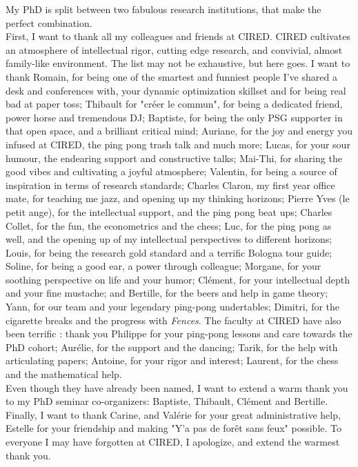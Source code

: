 My PhD is split between two fabulous research institutions, that make the perfect combination.
\\
First, I want to thank all my colleagues and friends at CIRED. CIRED cultivates an atmosphere of intellectual rigor, cutting edge research, and convivial, almost family-like environment. The list may not be exhaustive, but here goes. 
%
I want to thank Romain, for being one of the smartest and funniest people I've shared a desk and conferences with, your dynamic optimization skillset and for being real bad at paper toss; Thibault for "créer le commun", for being a dedicated friend, power horse and tremendous DJ; Baptiste, for being the only PSG supporter in that open space, and a brilliant critical mind;  Auriane, for the joy and energy you infused at CIRED, the ping pong trash talk and much more; Lucas, for your sour humour, the endearing support and constructive talks; Mai-Thi, for sharing the good vibes and cultivating a joyful atmosphere; Valentin, for being a source of inspiration in terms of research standards; Charles Claron, my first year office mate, for teaching me jazz, and opening up my thinking horizons; Pierre Yves (le petit ange), for the intellectual support, and the ping pong beat ups; Charles Collet, for the fun, the econometrics and the chess; Luc, for the ping pong as well, and the opening up of my intellectual perspectives to different horizons; Louis, for being the research gold standard and a terrific Bologna tour guide; Soline, for being a good ear, a power through colleague; Morgane, for your soothing perspective on life and your humor; Clément, for your intellectual depth and your fine mustache; and Bertille, for the beers and help in game theory; Yann, for our team and your legendary ping-pong undertables; Dimitri, for the cigarette breaks and the progress with \textit{Fences}. The faculty at CIRED have also been terrific : thank you Philippe for your ping-pong lessons and care towards the PhD cohort; Aurélie, for the support and the dancing; Tarik, for the help with articulating papers; Antoine, for your rigor and interest; Laurent, for the chess and the mathematical help. 
\\
Even though they have already been named, I want to extend a warm thank you to my  PhD seminar co-organizers: Baptiste, Thibault, Clément and Bertille. \\
Finally, I want to thank Carine, and Valérie for your great administrative help, Estelle for your friendship and making "Y'a pas de forêt sans feux" possible. To everyone I may have forgotten at CIRED, I apologize, and extend the warmest thank you. 

